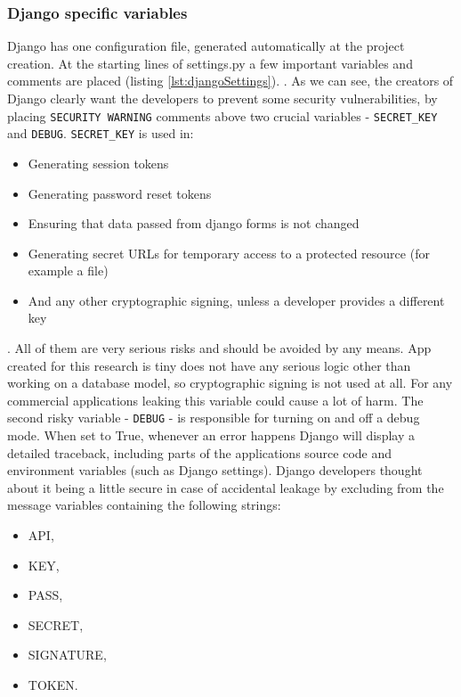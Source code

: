 \subsubsection{Django specific variables}
Django has one configuration file, generated automatically at the project creation. At the starting lines of settings.py a few important variables and comments are placed (listing \ref{lst:djangoSettings}).
.
As we can see, the creators of Django clearly want the developers to prevent some security vulnerabilities, by placing \lstinline{SECURITY WARNING} comments above two crucial variables - \lstinline{SECRET_KEY} and \lstinline{DEBUG}.
\lstinline{SECRET_KEY} is used in:
\begin{itemize}
    \item Generating session tokens
    \item Generating password reset tokens
    \item Ensuring that data passed from django forms is not changed
    \item Generating secret URLs for temporary access to a protected resource (for example a file)
    \item And any other cryptographic signing, unless a developer provides a different key
\end{itemize}.
All of them are very serious risks and should be avoided by any means. App created for this research is tiny does not have any serious logic other than working on a database model, so cryptographic signing is not used at all. For any commercial applications leaking this variable could cause a lot of harm.
The second risky variable - \lstinline{DEBUG} - is responsible for turning on and off a debug mode. When set to True, whenever an error happens Django will display a detailed traceback, including parts of the applications source code and environment variables (such as Django settings).
Django developers thought about it being a little secure in case of accidental leakage by excluding from the message variables containing the following strings:
\begin{itemize}
    \item API,
    \item KEY,
    \item PASS,
    \item SECRET,
    \item SIGNATURE,
    \item TOKEN.
\end{itemize}



